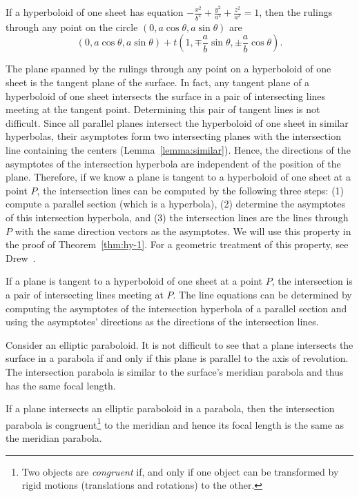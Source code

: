 \begin{lemma}
\label{lemma:rulings}
     If a hyperboloid of one sheet has equation $-\frac{x^2}{b^2}+
\frac{y^2}{a^2}+\frac{z^2}{a^2}=1$, then the rulings through any point
on the circle $(0,a\cos\!\theta,a\sin\!\theta)$ are
\[ (0,a\cos\theta,a\sin\theta)+
     t\left(1,\mp\frac{a}{b}\sin\theta,\pm\frac{a}{b}\cos\theta\right). \]
\end{lemma}

     The plane spanned by the rulings through any point on a hyperboloid of
one sheet is the tangent plane of the surface.  In fact, any tangent
plane of a hyperboloid of one sheet intersects the surface in a pair of
intersecting lines meeting at the tangent point.  Determining this pair
of tangent lines is not difficult.  Since all parallel planes intersect the
hyperboloid of one sheet in similar hyperbolas, their asymptotes form two
intersecting planes with the intersection line  containing the centers
(Lemma~\ref{lemma:similar}).
Hence, the directions of the asymptotes of the intersection hyperbola are
independent of the position of the plane.  Therefore, if we know a plane is
tangent to a hyperboloid of one sheet at a point $P$, the intersection lines
can be computed by the following three steps:
(1) compute a parallel section (which is a hyperbola),
(2) determine the asymptotes of this intersection hyperbola, and
(3) the intersection lines are the lines through $P$ with the same direction
vectors as the asymptotes.
We will use this property in the proof of Theorem~\ref{thm:hy-1}.
For a geometric treatment of this property, see
Drew~\cite[page 119]{drew:1875}.

\begin{lemma}
\label{lemma:asymptotes}
     If a plane is tangent to a hyperboloid of one sheet at a point $P$, the
intersection is a pair of intersecting lines meeting at $P$. The line equations
can be determined by computing the asymptotes of the intersection hyperbola of
a parallel section and using the asymptotes' directions as the directions of
the intersection lines.
\end{lemma}

     Consider an elliptic paraboloid.  It is not difficult to see that a plane
intersects the surface in a parabola if and only if this plane is parallel to
the axis of revolution.  The intersection parabola is similar to the surface's
meridian parabola and thus has the same focal length.

\begin{lemma}
\label{lemma:parabola-focal-length}
     If a plane intersects an elliptic paraboloid in a parabola, then
the intersection parabola is congruent\footnote{Two objects are
{\em congruent} if, and only if one object can be transformed by rigid motions
(translations and rotations) to the other.} to the meridian and hence its
focal length is the same as the meridian parabola.
\end{lemma}

